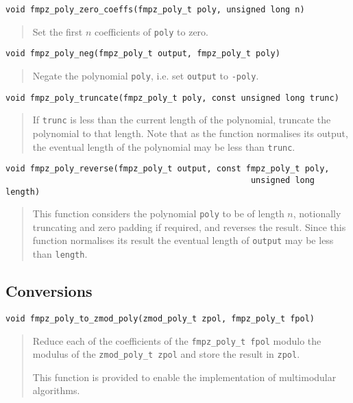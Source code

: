 \documentclass[a4paper,10pt]{article}
\newcommand{\code}{\lstinline}
\begin{document}
\begin{lstlisting}
void fmpz_poly_zero_coeffs(fmpz_poly_t poly, unsigned long n) 
\end{lstlisting}
\begin{quote}
Set the first $n$ coefficients of \code{poly} to zero. 
\end{quote}

\begin{lstlisting}
void fmpz_poly_neg(fmpz_poly_t output, fmpz_poly_t poly) 
\end{lstlisting}
\begin{quote}
Negate the polynomial \code{poly}, i.e. set \code{output} to \code{-poly}.
\end{quote}

\begin{lstlisting}
void fmpz_poly_truncate(fmpz_poly_t poly, const unsigned long trunc)
\end{lstlisting}
\begin{quote}
If \code{trunc} is less than the current length of the polynomial, truncate the polynomial to that length. Note that as the function normalises its output, the eventual length of the polynomial may be less than \code{trunc}.
\end{quote}

\begin{lstlisting}
void fmpz_poly_reverse(fmpz_poly_t output, const fmpz_poly_t poly,  
                                                  unsigned long length) 
\end{lstlisting}
\begin{quote}
This function considers the polynomial \code{poly} to be of length $n$, notionally truncating and zero padding if required, and reverses the result. Since this function normalises its result the eventual length of \code{output} may be less than \code{length}.
\end{quote}

\subsection{Conversions}

\begin{lstlisting}
void fmpz_poly_to_zmod_poly(zmod_poly_t zpol, fmpz_poly_t fpol)
\end{lstlisting}
\begin{quote}
Reduce each of the coefficients of the \code{fmpz_poly_t fpol} modulo the modulus of the \code{zmod_poly_t zpol} and store the result in \code{zpol}.

This function is provided to enable the implementation of multimodular algorithms.
\end{quote}
\end{document}
